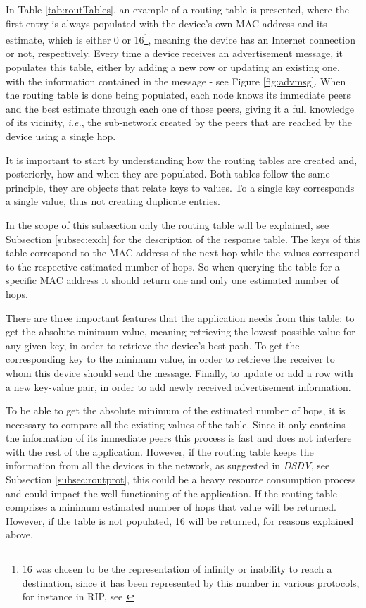 In Table \ref{tab:routTables}, an example of a routing table is presented, where the first entry is always populated with the device's own \gls{MAC} address and its estimate, which is either 0 or 16\footnote{16 was chosen to be the representation of infinity or inability to reach a destination, since it has been represented by this number in various protocols, for instance in \gls{RIP}, see \cite{ripprotocol}}, meaning the device has an Internet connection or not, respectively. Every time a device receives an advertisement message, it populates this table, either by adding a new row or updating an existing one, with the information contained in the message - see Figure \ref{fig:advmsg}. When the routing table is done being populated, each node knows its immediate peers and the best estimate through each one of those peers, giving it a full knowledge of its vicinity, \textit{i.e.}, the sub-network created by the peers that are reached by the device using a single hop.

It is important to start by understanding how the routing tables are created and, posteriorly, how and when they are populated. Both tables follow the same principle, they are objects that relate keys to values. To a single key corresponds a single value, thus not creating duplicate entries.

In the scope of this subsection only the routing table will be explained, see Subsection \ref{subsec:exch} for the description of the response table. The keys of this table correspond to the \gls{MAC} address of the next hop while the values correspond to the respective estimated number of hops. So when querying the table for a specific \gls{MAC} address it should return one and only one estimated number of hops.

There are three important features that the application needs from this table: to get the absolute minimum value, meaning retrieving the lowest possible value for any given key, in order to retrieve the device's best path. To get the corresponding key to the minimum value, in order to retrieve the receiver to whom this device should send the message. Finally, to update or add a row with a new key-value pair, in order to add newly received advertisement information.

To be able to get the absolute minimum of the estimated number of hops, it is necessary to compare all the existing values of the table. Since it only contains the information of its immediate peers this process is fast and does not interfere with the rest of the application. However, if the routing table keeps the information from all the devices in the network, as suggested in \textit{DSDV}, see Subsection \ref{subsec:routprot}, this could be a heavy resource consumption process and could impact the well functioning of the application. If the routing table comprises a minimum estimated number of hops that value will be returned. However, if the table is not populated, 16 will be returned, for reasons explained above.

